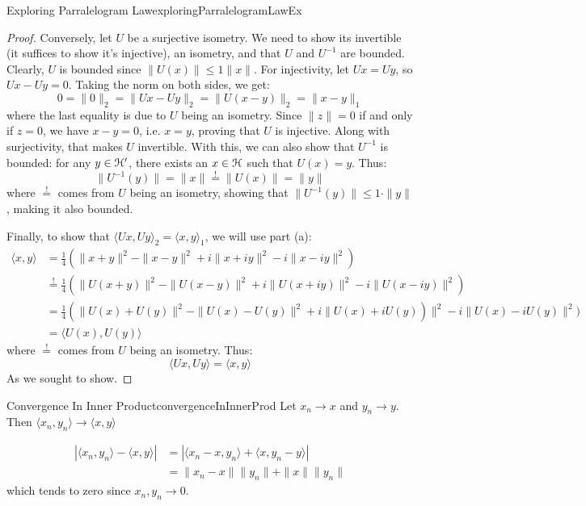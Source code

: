 \documentclass[oneside]{book}
\newcommand{\EH}{\EuScript{H}}
\begin{document}
\begin{example}{Exploring Parralelogram Law}{exploringParralelogramLawEx}
\begin{enumerate}
\begin{proof}
				Conversely, let $U$ be a surjective isometry. We need to show its invertible
				(it suffices to show it's injective), an isometry, and that $U$ and $U^{-1}$ are bounded. Clearly,
				$U$ is bounded since $\|U(x)\| \le 1\|x\|$. For injectivity, let $Ux = Uy$, so $Ux - Uy
				= 0$. Taking the norm on both sides, we get:
				\[
					0 = \|0\|_2 = \|Ux - Uy\|_2 = \|U(x-y)\|_2 = \|x-y\|_1
				\]
				where the last equality is due to $U$ being an isometry. Since $\|z\| = 0$ if and only if $z = 0$,
				we have $x-y = 0$, i.e. $x = y$, proving that $U$ is injective. Along with surjectivity, that makes
				$U$ invertible. With this, we can also show that $U^{-1}$ is bounded: for any $y \in \EH'$, there
				exists an $x \in \EH$ such that $U(x) = y$. Thus:
				\[
					\|U^{-1}(y)\| = \|x\| \overset{!}{=} \|U(x)\| = \|y\|
				\]
				where $\overset{!}{=}$ comes from $U$ being an isometry, showing that $\|U^{-1}(y)\| \le 1\cdot \|y\|$, making it also bounded.

				Finally, to show that $\langle Ux, Uy \rangle_2 = \langle x,y \rangle_1$, we will use part (a):
				\begin{align*}
					\langle x,y \rangle &= \frac{1}{4}(\|x+y\|^2 - \|x-y\|^2 + i\|x+iy\|^2 - i\|x-iy\|^2)\\
										&\overset{!}{=} \frac{1}{4}(\|U(x+y)\|^2 - \|U(x-y)\|^2 + i\|U(x+iy)\|^2
					- i\|U(x-iy)\|^2)\\
										&= \frac{1}{4}(\|U(x)+U(y)\|^2 - \|U(x)-U(y)\|^2 + i\|U(x)+iU(y))\|^2
										- i\|U(x)-iU(y)\|^2)\\
										&= \langle U(x), U(y)\rangle
				\end{align*}
				where $\overset{!}{=}$ comes from $U$ being an isometry. Thus:
				\[
					\langle Ux, Uy \rangle = \langle x,y\rangle
				\]
				As we sought to show.
			\end{proof}
	\end{enumerate}
\end{example}

\begin{prop}{Convergence In Inner Product}{convergenceInInnerProd}
	Let $x_n \to x$ and $y_n \to y$. Then $ \langle x_n, y_n \rangle \to \langle x,y \rangle$
\end{prop}

\begin{Proof}
	\begin{align*}
		| \langle x_n, y_n \rangle - \langle x,y \rangle| &= | \langle x_n - x, y_n \rangle + \langle x, y_n
		-y \rangle|\\
		&= \|x_n - x\|\|y_n\| + \|x\|\|y_n\|
	\end{align*}
	which tends to zero since $x_n, y_n \to 0$.
\end{Proof}
\end{document}
